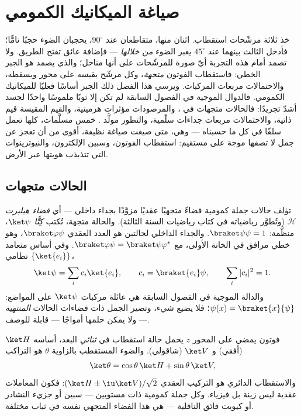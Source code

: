 \chapter{صياغة الميكانيك الكمومي}\label{ch:b3:quantum-formalism}

خذ ثلاثة مرشّحات استقطاب. اثنان منها، متقاطعان عند $90^\circ$،
يحجبان الضوء حجبًا تامًّا؛ فأدخل الثالث بينهما عند $45^\circ$
يعبر الضوء \emph{من خلالها} --- فإضافة عائق تفتح الطريق.
ولا تصمد أمام هذه التجربة أيّ صورة للمرشّحات على أنها مناخل؛ والذي
يصمد هو الجبر الخطي: فاستقطاب الفوتون \emph{متجهة}،
وكل مرشّح يقيسه على محور ويسقطه،
والاحتمالات مربعات المركبات. ويرسي هذا الفصل
ذلك الجبر أساسًا فعليًا للميكانيك الكمومي. فالدوال
الموجية في الفصول السابقة لم تكن إلا ثوبًا ملموسًا واحدًا لجسد
أشدّ تجريدًا: فالحالات متجهات في ،
والمرصودات مؤثرات هرميتية، والقيم المقيسة قيم ذاتية،
والاحتمالات مربعات جداءات سلّمية، والتطور مولَّد
. خمس مسلَّمات، كلها تعمل سلفًا في
كل ما حسبناه --- وهي، متى صيغت صياغة نظيفة، أقوى
من أن تعجز عن جمل لا تصفها موجة على مستقيم: استقطاب الفوتون،
وسبين الإلكترون، والنيوترينوات التي تتذبذب هويتها عبر الأرض.

\section{الحالات متجهات}

\begin{definition}\label{def:b3:quantum-formalism:state}
تؤلف حالات جملة كمومية فضاءً متجهيًا عقديًا مزوَّدًا
بجداء داخلي --- أي \emph{فضاء هيلبرت} $\mathcal H$ (وتُطوَّر
رياضياته في كتاب رياضيات السنة الثالثة). والحالة
متجهة، تُكتب \emph{كِتًّا} $\ket\psi$، منظَّمة:
$\braket\psi\psi = 1$. والجداء الداخلي لحالتين هو العدد
العقدي $\braket\varphi\psi$، وهو خطي مرافق في الخانة الأولى،
مع $\braket\varphi\psi = \braket\psi\varphi^*$. وفي أساس
متعامد نظامي $\{\ket{e_i}\}$،
\[
\ket\psi = \sum_i c_i\ket{e_i} , \qquad
c_i = \braket{e_i}\psi , \qquad
\sum_i|c_i|^2 = 1 .
\]
والدالة الموجية في الفصول السابقة هي عائلة
مركبات $\ket\psi$ على المواضع: $\psi(x) =
\braket{x}{\psi}$؛ فلا يضيع شيء، وتصير الجمل ذات فضاءات
الحالات \emph{المنتهية} --- ولا يمكن حلمها أمواجًا --- قابلة للوصف.
\end{definition}

\begin{example}\label{ex:b3:quantum-formalism:polarization}
فوتون يمضي على المحور $z$ يحمل حالة استقطاب في 
\emph{ثنائي} البعد، أساسه $\ket H$
(أفقي) و $\ket V$ (شاقولي). والضوء المستقطب بالزاوية
$\theta$ هو التراكب
\[
\ket\theta = \cos\theta\,\ket H + \sin\theta\,\ket V ,
\]
والاستقطاب الدائري هو التركيب العقدي $(\ket H \pm
\iu\ket V)/\sqrt2$: فكون المعاملات عقدية ليس زينة
بل فيزياء. وكل جملة كمومية ذات مستويين --- سبين أو جزيء
النشادر أو كيوبت فائق الناقلية --- هي هذا الفضاء المتجهي نفسه في
ثياب مختلفة.
\end{example}

